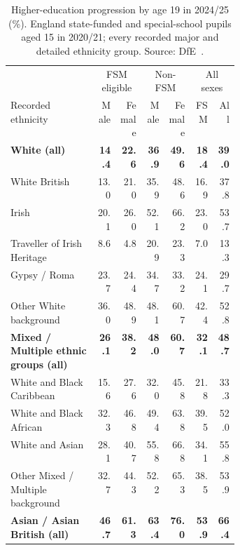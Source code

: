 \begin{table}[htbp]
\begingroup\small\setlength{\tabcolsep}{4pt}
\renewcommand{\arraystretch}{1.16}
\caption{Higher-education progression by age 19 in 2024/25 (\%). England state-funded and special-school pupils aged 15 in 2020/21; every recorded major and detailed ethnicity group. Source: DfE~\cite{dfe2026}.}\label{tab:dfe}
\medskip
\begin{tabular}{@{}>{\raggedright\arraybackslash}p{0.38\linewidth}rrrrrr@{}}
\toprule & \multicolumn{2}{c}{FSM eligible} & \multicolumn{2}{c}{Non-FSM} & \multicolumn{2}{c}{All sexes}\\
Recorded ethnicity & Male & Female & Male & Female & FSM & All\\\midrule
\textbf{White (all)} & \textbf{14.4} & \textbf{22.6} & \textbf{36.9} & \textbf{49.6} & \textbf{18.4} & \textbf{39.0}\\
\hspace*{0.7em}White British & 13.0 & 21.0 & 35.9 & 48.6 & 16.9 & 37.8\\
\hspace*{0.7em}Irish & 20.1 & 26.0 & 52.1 & 66.2 & 23.0 & 53.7\\
\hspace*{0.7em}Traveller of Irish Heritage & 8.6 & 4.8 & 20.9 & 23.3 & 7.0 & 13.3\\
\hspace*{0.7em}Gypsy / Roma & 23.7 & 24.4 & 34.7 & 33.2 & 24.1 & 29.7\\
\hspace*{0.7em}Other White background & 36.0 & 48.9 & 48.1 & 60.7 & 42.4 & 52.8\\
\addlinespace[3pt]
\textbf{Mixed / Multiple ethnic groups (all)} & \textbf{26.1} & \textbf{38.2} & \textbf{48.0} & \textbf{60.7} & \textbf{32.1} & \textbf{48.7}\\
\hspace*{0.7em}White and Black Caribbean & 15.6 & 27.6 & 32.0 & 45.8 & 21.8 & 33.3\\
\hspace*{0.7em}White and Black African & 32.3 & 46.8 & 49.4 & 63.8 & 39.5 & 52.0\\
\hspace*{0.7em}White and Asian & 28.1 & 40.7 & 55.8 & 66.8 & 34.1 & 55.8\\
\hspace*{0.7em}Other Mixed / Multiple background & 32.7 & 44.3 & 52.2 & 65.3 & 38.5 & 53.9\\
\addlinespace[3pt]
\textbf{Asian / Asian British (all)} & \textbf{46.7} & \textbf{61.3} & \textbf{63.4} & \textbf{76.0} & \textbf{53.9} & \textbf{66.4}\\

\end{tabular}
\end{table}
